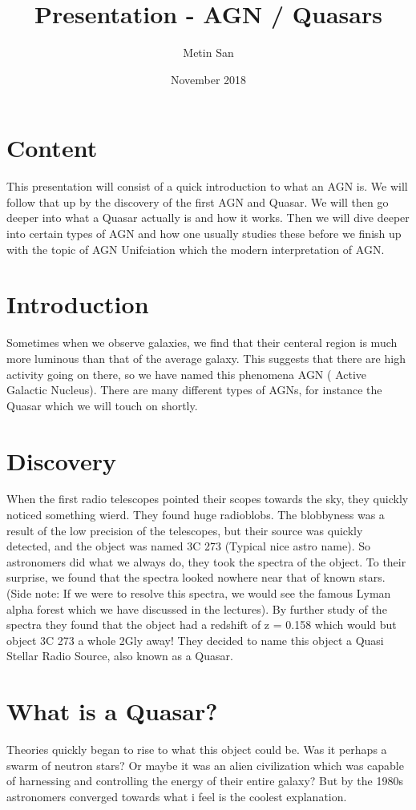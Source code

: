 \documentclass{article}
\title{Presentation - AGN / Quasars}
\author{Metin San}
\date{November 2018}
\begin{document}
\maketitle

\section*{Content}
This presentation will consist of a quick introduction to what an AGN is. We will follow that up by the discovery of the first AGN and Quasar. We will then go deeper into what a Quasar actually is and how it works. Then we will dive deeper into certain types of AGN and how one usually studies these before we finish up with the topic of AGN Unifciation which the modern interpretation of AGN.


\section*{Introduction}
Sometimes when we observe galaxies, we find that their centeral region is much more luminous than that of the average galaxy. This suggests that there are high activity going on there, so we have named this phenomena AGN ( Active Galactic Nucleus). There are many different types of AGNs, for instance the Quasar which we will touch on shortly.

\section*{Discovery}
When the first radio telescopes pointed their scopes towards the sky, they quickly noticed something wierd. They found huge radioblobs. The blobbyness was a result of the low precision of the telescopes, but their source was quickly detected, and the object was named 3C 273 (Typical nice astro name). So astronomers did what we always do, they took the spectra of the object. To their surprise, we found that the spectra looked nowhere near that of known stars. (Side note: If we were to resolve this spectra, we would see the famous Lyman alpha forest which we have discussed in the lectures). By further study of the spectra they found that the object had a redshift of z = 0.158 which would but object 3C 273 a whole 2Gly away! They decided to name this object a Quasi Stellar Radio Source, also known as a Quasar.

\section*{What is a Quasar?}
Theories quickly began to rise to what this object could be. Was it perhaps a swarm of neutron stars? Or maybe it was an alien civilization which was capable of harnessing and controlling the energy of their entire galaxy? But by the 1980s astronomers converged towards what i feel is the coolest explanation.
\end{document}
